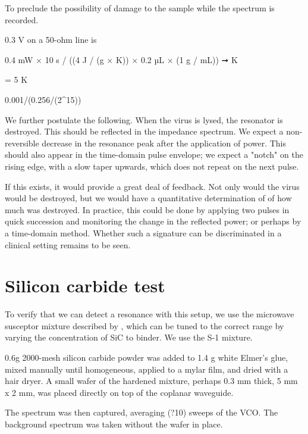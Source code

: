 \documentclass[paper.tex]{subfiles}%
\begin{document}
To preclude the possibility of damage to the sample while the spectrum is recorded.

0.3 V on a 50-ohm line is

0.4 mW × 10 s / ((4 J / (g × K)) × 0.2 µL × (1 g / mL)) ➞ K

 = 5 K

0.001/(0.256/(2^15))


We further postulate the following. When the virus is lysed, the resonator is destroyed. This should be reflected in the impedance spectrum.
We expect a non-reversible decrease in the resonance peak after the application of power. This should also appear in the time-domain pulse envelope;
we expect a "notch" on the rising edge, with a slow taper upwards, which does not repeat on the next pulse.

If this exists, it would provide a great deal of feedback. Not only would the virus would be destroyed, but we would have a quantitative determination of
of how much was destroyed. In practice, this could be done by applying two pulses in quick succession and monitoring the change in the reflected power;
or perhaps by a time-domain method. Whether such a signature can be discriminated in a clinical setting remains to be seen.


\section{Silicon carbide test}

To verify that we can detect a resonance with this setup, we use the microwave susceptor mixture described by \cite{Effect2016}, which can be tuned to the correct range by varying the concentration of SiC to binder. We use the S-1 mixture.

0.6g 2000-mesh silicon carbide powder was added to 1.4 g white Elmer's glue, mixed manually until homogeneous,
 applied to a mylar film, and dried with a hair dryer. A small wafer of the hardened mixture, perhaps 0.3 mm thick, 5 mm x 2 mm, was placed directly on top of the coplanar waveguide.


The spectrum was then captured, averaging (?10) sweeps of the VCO. The background spectrum was taken without the wafer in place.

\begin{figure}[H]
        
        \caption{}
\end{figure}

\begin{figure}[H]
        
        \caption{}
\end{figure}
\end{document}
